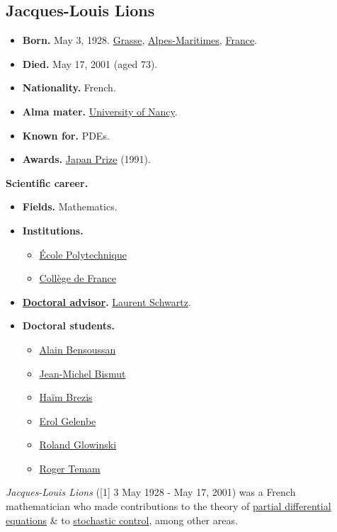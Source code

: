 \documentclass{article}
\begin{document}
\subsection{Jacques-Louis Lions}
\begin{itemize}
	\item \textbf{Born.} May 3, 1928. \href{https://en.wikipedia.org/wiki/Grasse}{Grasse}, \href{https://en.wikipedia.org/wiki/Alpes-Maritimes}{Alpes-Maritimes}, \href{https://en.wikipedia.org/wiki/France}{France}.
	\item \textbf{Died.} May 17, 2001 (aged 73).
	\item \textbf{Nationality.} French.
	\item \textbf{Alma mater.} \href{https://en.wikipedia.org/wiki/University_of_Nancy}{University of Nancy}.
	\item \textbf{Known for.} PDEs.
	\item \textbf{Awards.} \href{https://en.wikipedia.org/wiki/Japan_Prize}{Japan Prize} (1991).
\end{itemize}
\textbf{Scientific career.}
\begin{itemize}
	\item \textbf{Fields.} Mathematics.
	\item \textbf{Institutions.}
	\begin{itemize}
		\item \href{https://en.wikipedia.org/wiki/%C3%89cole_Polytechnique}{\'Ecole Polytechnique}
		\item \href{https://en.wikipedia.org/wiki/Coll%C3%A8ge_de_France}{Coll\`ege de France}
	\end{itemize}
	\item \textbf{\href{https://en.wikipedia.org/wiki/Doctoral_advisor}{Doctoral advisor}.} \href{https://en.wikipedia.org/wiki/Laurent_Schwartz}{Laurent Schwartz}.
	\item \textbf{Doctoral students.}
	\begin{itemize}
		\item \href{https://en.wikipedia.org/wiki/Alain_Bensoussan}{Alain Bensoussan}
		\item \href{https://en.wikipedia.org/wiki/Jean-Michel_Bismut}{Jean-Michel Bismut}
		\item \href{https://en.wikipedia.org/wiki/Ha%C3%AFm_Brezis}{Ha\"im Brezis}
		\item \href{https://en.wikipedia.org/wiki/Erol_Gelenbe}{Erol Gelenbe}
		\item \href{https://en.wikipedia.org/wiki/Roland_Glowinski}{Roland Glowinski}
		\item \href{https://en.wikipedia.org/wiki/Roger_Temam}{Roger Temam}
	\end{itemize}
\end{itemize}
\textit{Jacques-Louis Lions} ([1] 3 May 1928 - May 17, 2001) was a French mathematician who made contributions to the theory of \href{https://en.wikipedia.org/wiki/Partial_differential_equation}{partial differential equations} \& to \href{https://en.wikipedia.org/wiki/Stochastic_processes}{stochastic control}, among other areas.
\end{document}
